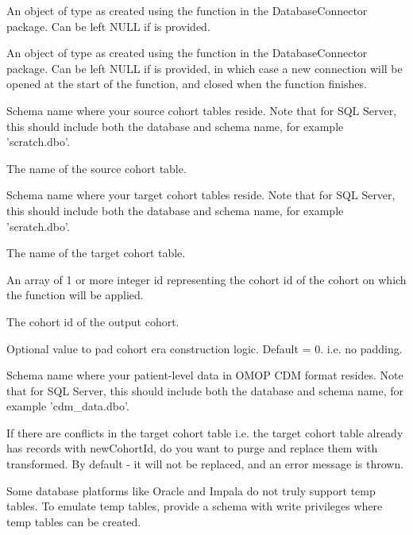 \documentclass[a4paper]{book}
\begin{document}
\begin{Arguments}
\begin{ldescription}
\item[\code{connectionDetails}] An object of type  as created using the
 function in the
DatabaseConnector package. Can be left NULL if  is
provided.

\item[\code{connection}] An object of type  as created using the
 function in the
DatabaseConnector package. Can be left NULL if 
is provided, in which case a new connection will be opened at the start
of the function, and closed when the function finishes.

\item[\code{sourceCohortDatabaseSchema}] Schema name where your source cohort tables reside. Note that for SQL Server,
this should include both the database and schema name, for example
'scratch.dbo'.

\item[\code{sourceCohortTable}] The name of the source cohort table.

\item[\code{targetCohortDatabaseSchema}] Schema name where your target cohort tables reside. Note that for SQL Server,
this should include both the database and schema name, for example
'scratch.dbo'.

\item[\code{targetCohortTable}] The name of the target cohort table.

\item[\code{oldCohortIds}] An array of 1 or more integer id representing the cohort id of the cohort
on which the function will be applied.

\item[\code{newCohortId}] The cohort id of the output cohort.

\item[\code{eraconstructorpad}] Optional value to pad cohort era construction logic. Default = 0. i.e. no padding.

\item[\code{cdmDatabaseSchema}] Schema name where your patient-level data in OMOP CDM format resides.
Note that for SQL Server, this should include both the database and
schema name, for example 'cdm\_data.dbo'.

\item[\code{purgeConflicts}] If there are conflicts in the target cohort table i.e. the target cohort table
already has records with newCohortId, do you want to purge and replace them
with transformed. By default - it will not be replaced, and an error message is thrown.

\item[\code{tempEmulationSchema}] Some database platforms like Oracle and Impala do not truly support
temp tables. To emulate temp tables, provide a schema with write
privileges where temp tables can be created.
\end{ldescription}
\end{Arguments}
\end{document}
